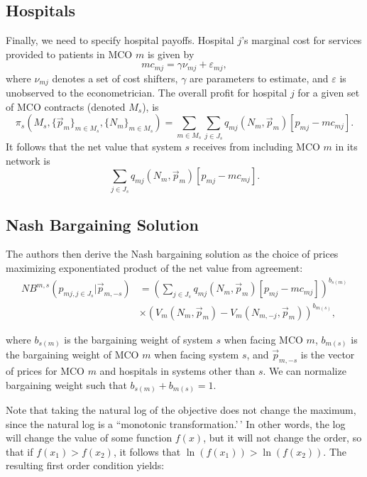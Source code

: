 \documentclass[
  letterpaper,
  DIV=11,
  numbers=noendperiod]{scrreport}
\theoremstyle{definition}
\theoremstyle{remark}
\begin{document}
\hypertarget{hospitals-1}{%
\subsection{Hospitals}\label{hospitals-1}}

Finally, we need to specify hospital payoffs. Hospital \(j\)'s marginal
cost for services provided to patients in MCO \(m\) is given by
\[mc_{mj}=\gamma \nu_{mj} + \varepsilon_{mj},\] where \(\nu_{mj}\)
denotes a set of cost shifters, \(\gamma\) are parameters to estimate,
and \(\varepsilon\) is unobserved to the econometrician. The overall
profit for hospital \(j\) for a given set of MCO contracts (denoted
\(M_{s}\)), is
\[\pi_{s}\left(M_{s},\{\vec{p}_{m}\}_{m\in M_{s}},\{N_{m} \}_{m\in M_{s}} \right)=\sum_{m\in M_{s}} \sum_{j \in J_{s}} q_{mj}(N_{m},\vec{p}_{m}) \left[p_{mj} - mc_{mj} \right].\]
It follows that the net value that system \(s\) receives from including
MCO \(m\) in its network is
\[\sum_{j \in J_{s}} q_{mj}(N_{m},\vec{p}_{m}) \left[p_{mj} - mc_{mj} \right].\]

\hypertarget{nash-bargaining-solution}{%
\subsection{Nash Bargaining Solution}\label{nash-bargaining-solution}}

The authors then derive the Nash bargaining solution as the choice of
prices maximizing exponentiated product of the net value from agreement:
\[\begin{align*}
NB^{m,s} \left(p_{mj, j\in J_{s}} | \vec{p}_{m,-s}\right) &= \left(\sum_{j\in J_{s}}q_{mj}(N_{m},\vec{p}_{m}) \left[p_{mj} - mc_{mj} \right]\right)^{b_{s(m)}} \\
& \times \left(V_{m}(N_{m},\vec{p}_{m})-V_{m}(N_{m,-j},\vec{p}_{m})\right)^{b_{m(s)}},
\end{align*}\]

where \(b_{s(m)}\) is the bargaining weight of system \(s\) when facing
MCO \(m\), \(b_{m(s)}\) is the bargaining weight of MCO \(m\) when
facing system \(s\), and \(\vec{p}_{m,-s}\) is the vector of prices for
MCO \(m\) and hospitals in systems other than \(s\). We can normalize
bargaining weight such that \(b_{s(m)} + b_{m(s)} = 1\).

Note that taking the natural log of the objective does not change the
maximum, since the natural log is a ``monotonic transformation.'\,' In
other words, the log will change the value of some function \(f(x)\),
but it will not change the order, so that if \(f(x_{1})>f(x_{2})\), it
follows that \(\ln (f(x_{1})) > \ln (f(x_{2}))\). The resulting first
order condition yields:
\end{document}
